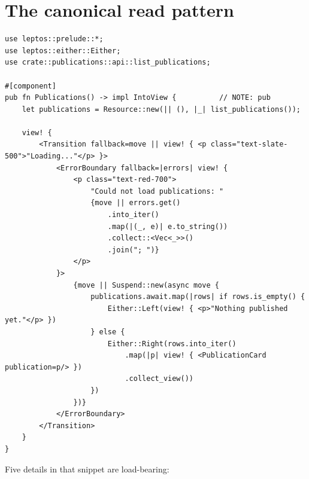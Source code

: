 \section{The canonical read pattern}

\begin{pattern}
\begin{lstlisting}[style=rs,caption={\file{src/publications/components.rs} --- the shape to grow the
current placeholder into.}]
use leptos::prelude::*;
use leptos::either::Either;
use crate::publications::api::list_publications;

#[component]
pub fn Publications() -> impl IntoView {          // NOTE: pub
    let publications = Resource::new(|| (), |_| list_publications());

    view! {
        <Transition fallback=move || view! { <p class="text-slate-500">"Loading..."</p> }>
            <ErrorBoundary fallback=|errors| view! {
                <p class="text-red-700">
                    "Could not load publications: "
                    {move || errors.get()
                        .into_iter()
                        .map(|(_, e)| e.to_string())
                        .collect::<Vec<_>>()
                        .join("; ")}
                </p>
            }>
                {move || Suspend::new(async move {
                    publications.await.map(|rows| if rows.is_empty() {
                        Either::Left(view! { <p>"Nothing published yet."</p> })
                    } else {
                        Either::Right(rows.into_iter()
                            .map(|p| view! { <PublicationCard publication=p/> })
                            .collect_view())
                    })
                })}
            </ErrorBoundary>
        </Transition>
    }
}
\end{lstlisting}
\end{pattern}

Five details in that snippet are load-bearing:

